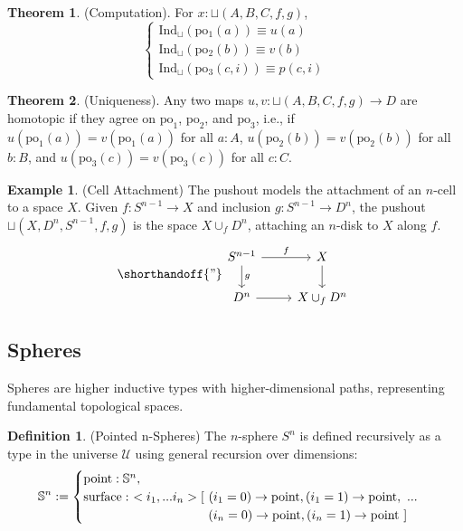 \documentclass{article}
\theoremstyle{definition}
\newtheorem{theorem}{Theorem}
\newtheorem{definition}{Definition}
\newtheorem{example}{Example}
\begin{document}
\begin{theorem} (Computation).
For \( x : \sqcup(A,B,C,f,g) \),
\[
\begin{cases}
\text{Ind$_\sqcup$}(\text{po$_1$}(a)) \equiv u(a) \\
\text{Ind$_\sqcup$}(\text{po$_2$}(b)) \equiv v(b) \\
\text{Ind$_\sqcup$}(\text{po$_3$}(c,i)) \equiv p(c,i)
\end{cases}
\]
\end{theorem}

\begin{theorem} (Uniqueness).
Any two maps \( u, v : \sqcup(A,B,C,f,g) \to D \) are homotopic
if they agree on \( \text{po}_1 \), \( \text{po}_2 \), and \( \text{po}_3 \), i.e.,
if \( u(\text{po}_1(a)) = v(\text{po}_1(a)) \) for all \( a : A \), \( u(\text{po}_2(b)) = v(\text{po}_2(b)) \)
for all \( b : B \), and \( u(\text{po}_3(c)) = v(\text{po}_3(c)) \) for all \( c : C \).
\end{theorem}

\begin{example} (Cell Attachment)
The pushout models the attachment of an \( n \)-cell to a space \( X \).
Given \( f : S^{n-1} \to X \) and inclusion \( g : S^{n-1} \to D^n \),
the pushout \( \sqcup(X,D^n,S^{n-1},f,g) \) is
the space \( X \cup_f D^n \), attaching an \( n \)-disk to \( X \) along \( f \).
\[
\shorthandoff{"}
\begin{tikzcd}
S^{n-1} \arrow[r, "f"] \arrow[d, "g"] & X \arrow[d] \\
D^n \arrow[r] & X \cup_f D^n
\end{tikzcd}
\]
\end{example}

\subsection{Spheres}
Spheres are higher inductive types with higher-dimensional paths,
representing fundamental topological spaces.

\begin{definition} (Pointed n-Spheres)
The \( n \)-sphere \( S^n \) is defined recursively as a type in
the universe \( \mathcal{U} \) using general recursion over dimensions:
\[
\mathbb{S}^n :=
\begin{cases}
\text{point} : \mathbb{S}^n, \\
\text{surface} :\ <i_1,...i_n> [\ (i_1=0) \rightarrow \text{point}, (i_1=1) \rightarrow \text{point},\ ... \\
\hspace{3.47cm} (i_n=0) \rightarrow \text{point}, (i_n=1) \rightarrow \text{point}\ ]
\end{cases}
\]
\end{definition}
\end{document}
